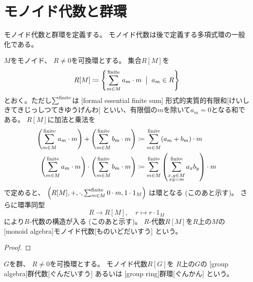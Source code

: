 \documentclass[report]{jlreq}
\begin{document}
%
\section{モノイド代数と群環}

モノイド代数と群環を定義する。
モノイド代数は後で定義する多項式環の一般化である。

\begin{definition}[モノイド代数]
    $M$をモノイド、
    $R \neq 0$を可換環とする。
    集合$R[M]$を
    \begin{equation}
        R[M] \coloneqq \left\{
            \sum^{\text{finite}}_{m \in M} a_m \cdot m
            \; \bigm\vert \;
            a_m \in R
        \right\}
    \end{equation}
    とおく。ただし$\sum^{\text{finite}}$は
    [formal essential finite sum]
    {形式的実質的有限和}[けいしきてきじっしつてきゆうげんわ]
    といい、有限個の$m$を除いて$a_m = 0$となる和である。
    $R[M]$に加法と乗法を
    \begin{alignat}{1}
        \left( \sum^{\text{finite}}_{m \in M} a_m \cdot m \right)
            + \left( \sum^{\text{finite}}_{m \in M} b_m \cdot m \right)
            &\coloneqq \sum^{\text{finite}}_{m \in M} (a_m + b_m) \cdot m \\
        \left( \sum^{\text{finite}}_{m \in M} a_m \cdot m \right)
            \cdot \left( \sum^{\text{finite}}_{m \in M} b_m \cdot m \right)
            &\coloneqq \sum^{\text{finite}}_{m \in M} \left(
                \sum^{\text{finite}}_{\substack{x, y \in M \\ xy = m}} a_x b_y
            \right) \cdot m
    \end{alignat}
    で定めると、
    $\left( R[M], +, \cdot, \sum^{\text{finite}}_{m \in M} 0 \cdot m, 1 \cdot 1_M \right)$
    は環となる (このあと示す)。
    さらに環準同型
    \begin{equation}
        R \to R[M],
        \quad
        r \mapsto r \cdot 1_M
    \end{equation}
    により$R$-代数の構造が入る (このあと示す)。
    $R$-代数$R[M]$を$R$上の$M$の
    [monoid algebra]{モノイド代数}[ものいどだいすう]
    という。
\end{definition}

\begin{proof}
    \TODO{}
\end{proof}

\begin{definition}[群代数]
    $G$を群、
    $R \neq 0$を可換環とする。
    モノイド代数$R[G]$を
    $R$上の$G$の
    [group algebra]{群代数}[ぐんだいすう]
    あるいは
    [group ring]{群環}[ぐんかん]
    という。
\end{definition}
\end{document}
